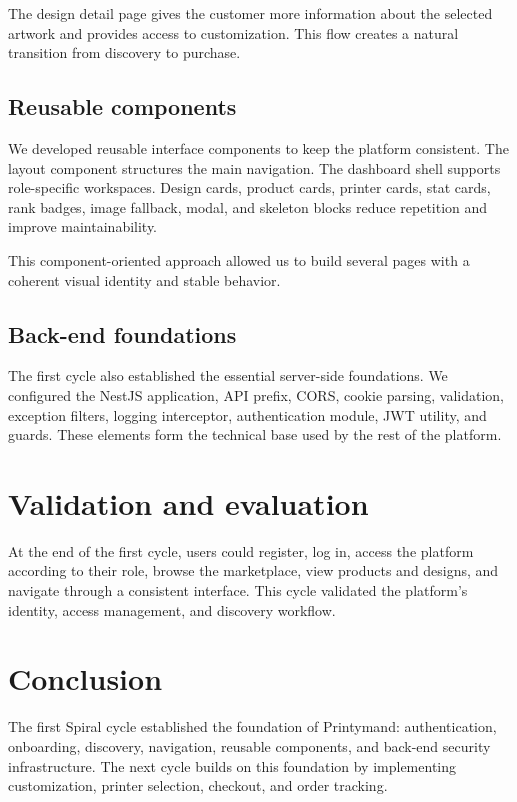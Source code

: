 The design detail page gives the customer more information about the selected artwork and provides access to customization.
This flow creates a natural transition from discovery to purchase.


\subsection{Reusable components}
We developed reusable interface components to keep the platform consistent.
The layout component structures the main navigation.
The dashboard shell supports role-specific workspaces.
Design cards, product cards, printer cards, stat cards, rank badges, image fallback, modal, and skeleton blocks reduce repetition and improve maintainability.

This component-oriented approach allowed us to build several pages with a coherent visual identity and stable behavior.

\subsection{Back-end foundations}
The first cycle also established the essential server-side foundations.
We configured the NestJS application, API prefix, CORS, cookie parsing, validation, exception filters, logging interceptor, authentication module, JWT utility, and guards.
These elements form the technical base used by the rest of the platform.

\section{Validation and evaluation}
At the end of the first cycle, users could register, log in, access the platform according to their role, browse the marketplace, view products and designs, and navigate through a consistent interface.
This cycle validated the platform's identity, access management, and discovery workflow.

\section{Conclusion}
The first Spiral cycle established the foundation of Printymand: authentication, onboarding, discovery, navigation, reusable components, and back-end security infrastructure.
The next cycle builds on this foundation by implementing customization, printer selection, checkout, and order tracking.